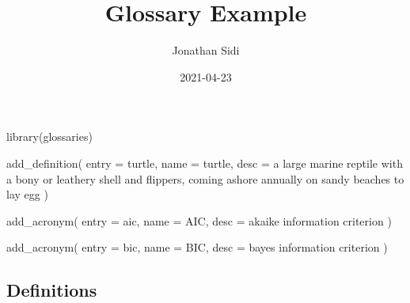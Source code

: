 \documentclass[
]{article}
\title{Glossary Example}
\author{Jonathan Sidi}
\date{2021-04-23}
\newenvironment{Shaded}{\begin{snugshade}}{\end{snugshade}}
\newcommand{\AttributeTok}[1]{\textcolor[rgb]{0.77,0.63,0.00}{#1}}
\newcommand{\FunctionTok}[1]{\textcolor[rgb]{0.00,0.00,0.00}{#1}}
\newcommand{\NormalTok}[1]{#1}
\newcommand{\StringTok}[1]{\textcolor[rgb]{0.31,0.60,0.02}{#1}}
\begin{document}
\maketitle

\begin{Shaded}
\begin{Highlighting}[]
\FunctionTok{library}\NormalTok{(glossaries)}
\end{Highlighting}
\end{Shaded}

\begin{Shaded}
\begin{Highlighting}[]
\FunctionTok{add\_definition}\NormalTok{(}
  \AttributeTok{entry =} \StringTok{\textquotesingle{}turtle\textquotesingle{}}\NormalTok{,}
  \AttributeTok{name =} \StringTok{\textquotesingle{}turtle\textquotesingle{}}\NormalTok{,}
  \AttributeTok{desc =} \StringTok{\textquotesingle{}a large marine reptile with a bony or leathery shell and flippers, coming ashore annually on sandy beaches to lay egg\textquotesingle{}}
\NormalTok{  )}
\end{Highlighting}
\end{Shaded}

\begin{Shaded}
\begin{Highlighting}[]
\FunctionTok{add\_acronym}\NormalTok{(}
  \AttributeTok{entry =} \StringTok{\textquotesingle{}aic\textquotesingle{}}\NormalTok{,}
  \AttributeTok{name =} \StringTok{\textquotesingle{}AIC\textquotesingle{}}\NormalTok{,}
  \AttributeTok{desc =} \StringTok{\textquotesingle{}akaike information criterion\textquotesingle{}}
\NormalTok{)}

\FunctionTok{add\_acronym}\NormalTok{(}
  \AttributeTok{entry =} \StringTok{\textquotesingle{}bic\textquotesingle{}}\NormalTok{,}
  \AttributeTok{name =} \StringTok{\textquotesingle{}BIC\textquotesingle{}}\NormalTok{,}
  \AttributeTok{desc =} \StringTok{\textquotesingle{}bayes information criterion\textquotesingle{}}
\NormalTok{)}
\end{Highlighting}
\end{Shaded}

\hypertarget{definitions}{%
\subsection{Definitions}\label{definitions}}
\end{document}

